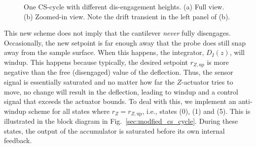 \documentclass[twocolumn,twoside]{IEEEtran/IEEEtran}
\begin{document}
\begin{figure}[ht!]
  \begin{subfigure}{.48\textwidth}
    
    \caption{ }
  \end{subfigure}
  \begin{subfigure}{.48\textwidth}
    
    \caption{ }
  \end{subfigure}
  \caption{One CS-cycle with different dis-engagement heights. (a) Full view.
    (b) Zoomed-in view. Note the drift transient in the left panel of (b). }
  \label{fig:z_drift}
\end{figure}

This new scheme does not imply that the cantilever \emph{never} fully
disengages. Occasionally, the new setpoint is far enough away that the probe
does still snap away from the sample surface. When this happens, the integrator,
$D_I(z)$, will windup. This happens because typically, the desired setpoint
$r_{Z,\textrm{up}}$ is more negative than the free (disengaged) value of the
deflection. Thus, the sensor signal is essentially saturated and no matter how
far the $Z$-actuator tries to move, no change will result in the deflection,
leading to windup and a control signal that exceeds the actuator bounds. To deal
with this, we implement an anti-windup scheme for all states where
$r_Z=r_{Z,\textrm{up}}$, i.e., states (0), (1) and (5). This is illustrated in
the block diagram in Fig.~\ref{sec:modfied_cs_cycle}. During these states, the
output of the accumulator is saturated before its own internal feedback.
\end{document}
